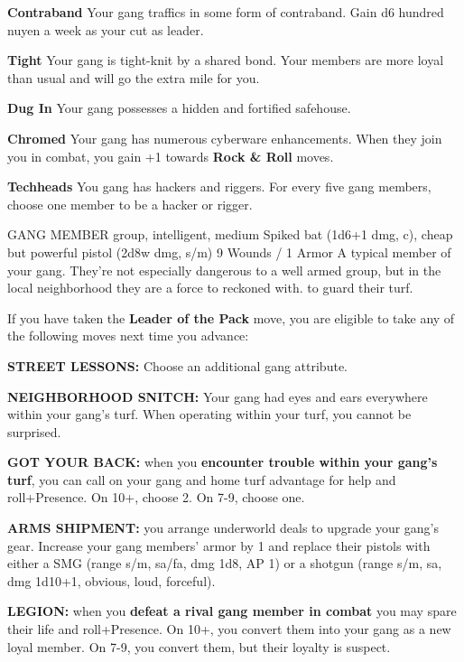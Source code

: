 \documentclass[oneside,10pt]{article}
\begin{document}
\begin{multicols}{2}
\begin{adjustwidth*}{.5cm}{.5cm}
\textbf{Contraband} Your gang traffics in some
form of contraband. Gain d6 hundred nuyen a week
as your cut as leader.

\textbf{Tight} Your gang is tight-knit by a shared
bond. Your members are more loyal than usual and
will go the extra mile for you.

\textbf{Dug In} Your gang possesses a hidden and
fortified safehouse. 

\textbf{Chromed} Your gang has numerous cyberware
enhancements. When they join you in combat, you
gain +1 towards \textbf{Rock \& Roll} moves.

\textbf{Techheads} You gang has hackers and
riggers. For every five gang members, choose one
member to be a hacker or rigger.

\end{adjustwidth*}

\critterspec
{GANG MEMBER}
{group, intelligent, medium}
{Spiked bat (1d6+1 dmg, c), cheap but powerful pistol (2d8w dmg, s/m)}
{9 Wounds / 1 Armor}
{A typical member of your gang. They're not
  especially dangerous to a well armed group, but
  in the local neighborhood they are a force to
  reckoned with.}
{to guard their turf.}
{}

If you have taken the \textbf{Leader of the Pack}
move, you are eligible to take any of the
following moves next time you advance:

\textbf{STREET LESSONS:} Choose an additional gang attribute.

\textbf{NEIGHBORHOOD SNITCH:} Your gang had eyes
and ears everywhere within your gang's turf. When
operating within your turf, you cannot be
surprised. 

\textbf{GOT YOUR BACK:} when you \textbf{encounter
  trouble within your gang's turf}, you can call
on your gang and home turf advantage for help and roll+Presence. On 10+,
choose 2. On 7-9, choose one.
\begin{moveoptions}
 


\end{moveoptions}

\textbf{ARMS SHIPMENT:} you arrange underworld
deals to upgrade your gang's gear. Increase your
gang members' armor by 1 and replace their pistols
with either a SMG (range s/m, sa/fa, dmg 1d8, AP
1) or a shotgun (range s/m, sa, dmg 1d10+1, obvious, loud,
forceful).

\textbf{LEGION:} when you \textbf{defeat a rival
  gang member in combat} you may spare their life
and roll+Presence. On 10+, you convert them into
your gang as a new loyal member. On 7-9, you convert
them, but their loyalty is suspect. 

\end{multicols}
\end{document}
